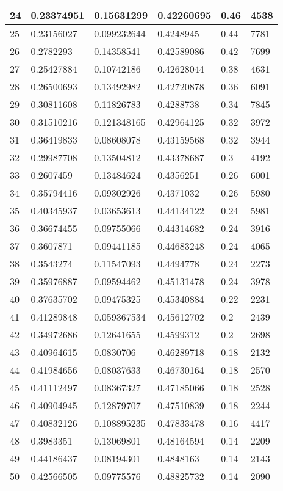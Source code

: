 \begin{longtable}{|l|l|l|l|l|l|}
24 & 0.23374951 & 0.15631299 & 0.42260695 & 0.46 & 4538 \\ \hline 
25 & 0.23156027 & 0.099232644 & 0.4248945 & 0.44 & 7781 \\ \hline 
26 & 0.2782293 & 0.14358541 & 0.42589086 & 0.42 & 7699 \\ \hline 
27 & 0.25427884 & 0.10742186 & 0.42628044 & 0.38 & 4631 \\ \hline 
28 & 0.26500693 & 0.13492982 & 0.42720878 & 0.36 & 6091 \\ \hline 
29 & 0.30811608 & 0.11826783 & 0.4288738 & 0.34 & 7845 \\ \hline 
30 & 0.31510216 & 0.121348165 & 0.42964125 & 0.32 & 3972 \\ \hline 
31 & 0.36419833 & 0.08608078 & 0.43159568 & 0.32 & 3944 \\ \hline 
32 & 0.29987708 & 0.13504812 & 0.43378687 & 0.3 & 4192 \\ \hline 
33 & 0.2607459 & 0.13484624 & 0.4356251 & 0.26 & 6001 \\ \hline 
34 & 0.35794416 & 0.09302926 & 0.4371032 & 0.26 & 5980 \\ \hline 
35 & 0.40345937 & 0.03653613 & 0.44134122 & 0.24 & 5981 \\ \hline 
36 & 0.36674455 & 0.09755066 & 0.44314682 & 0.24 & 3916 \\ \hline 
37 & 0.3607871 & 0.09441185 & 0.44683248 & 0.24 & 4065 \\ \hline 
38 & 0.3543274 & 0.11547093 & 0.4494778 & 0.24 & 2273 \\ \hline 
39 & 0.35976887 & 0.09594462 & 0.45131478 & 0.24 & 3978 \\ \hline 
40 & 0.37635702 & 0.09475325 & 0.45340884 & 0.22 & 2231 \\ \hline 
41 & 0.41289848 & 0.059367534 & 0.45612702 & 0.2 & 2439 \\ \hline 
42 & 0.34972686 & 0.12641655 & 0.4599312 & 0.2 & 2698 \\ \hline 
43 & 0.40964615 & 0.0830706 & 0.46289718 & 0.18 & 2132 \\ \hline 
44 & 0.41984656 & 0.08037633 & 0.46730164 & 0.18 & 2570 \\ \hline 
45 & 0.41112497 & 0.08367327 & 0.47185066 & 0.18 & 2528 \\ \hline 
46 & 0.40904945 & 0.12879707 & 0.47510839 & 0.18 & 2244 \\ \hline 
47 & 0.40832126 & 0.108895235 & 0.47833478 & 0.16 & 4417 \\ \hline 
48 & 0.3983351 & 0.13069801 & 0.48164594 & 0.14 & 2209 \\ \hline 
49 & 0.44186437 & 0.08194301 & 0.4848163 & 0.14 & 2143 \\ \hline 
50 & 0.42566505 & 0.09775576 & 0.48825732 & 0.14 & 2090 \\ \hline 
\end{longtable}